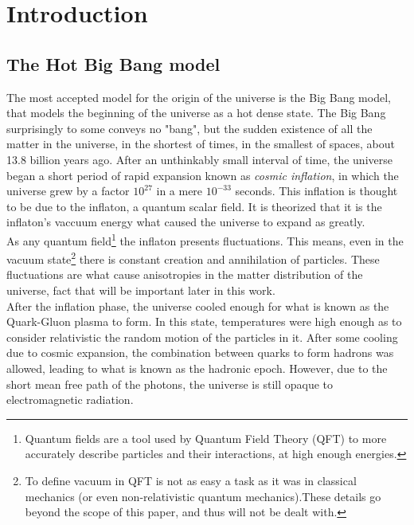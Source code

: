 \chapter{Introduction}

\section{The Hot Big Bang model}

The most accepted model for the origin of the universe is the Big Bang model, that models the beginning of the universe as a hot dense state. The Big Bang surprisingly to some conveys no "bang", but the sudden existence of all the matter in the universe, in the shortest of times, in the smallest of spaces, about 13.8 billion years ago. After an unthinkably small interval of time, the universe began a short period of rapid expansion known as \textit{cosmic inflation}, in which the universe grew by a factor $10^{27}$ in a mere $10^{-33}$ seconds. This inflation is thought to be due to the inflaton, a quantum scalar field. It is theorized that it is the inflaton's vaccuum energy what caused the universe to expand as greatly. \\

As any quantum field\footnote{Quantum fields are a tool used by Quantum Field Theory (QFT) to more accurately describe particles and their interactions, at high enough energies.} the inflaton presents fluctuations. This means, even in the vacuum state\footnote{To define vacuum in QFT is not as easy a task as it was in classical mechanics (or even non-relativistic quantum mechanics).These details go beyond the scope of this paper, and thus will not be dealt with.} there is constant creation and annihilation of particles. These fluctuations are what cause anisotropies in the matter distribution of the universe, fact that will be important later in this work. \\

After the inflation phase, the universe cooled enough for what is known as the Quark-Gluon plasma to form. In this state, temperatures were high enough as to consider relativistic the random motion of the particles in it. After some cooling due to cosmic expansion, the combination between quarks to form hadrons was allowed, leading to what is known as the hadronic epoch. However, due to the short mean free path of the photons, the universe is still opaque to electromagnetic radiation. \\

